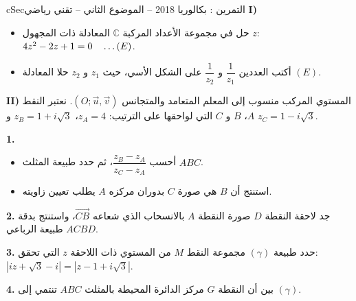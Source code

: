 \documentclass[12pt,a4paper]{article}
\newenvironment{BOX}[2]{\begin{otherlanguage}{english}\begin{arbox}{#1}{#2}}{\end{arbox}\end{otherlanguage}}
\newcounter{exo}
\newenvironment{tamrin}[1]{\stepcounter{exo}\begin{BOX}{cSec}{التمرين \theexo: #1}}{\end{BOX}}
\renewcommand{\dots}{\mathinner{\ldotp\ldotp\ldotp}}
\newenvironment{sq}{\begin{itemize}[leftmargin=2.4em,itemsep=3pt]}{\end{itemize}}
\newcommand{\qa}{\item[(أ)]}\newcommand{\qb}{\item[(ب)]}\newcommand{\qc}{\item[(جـ)]}\newcommand{\qd}{\item[(د)]}\newcommand{\qe}{\item[(هـ)]}
\newcommand{\QQ}[1]{\par\smallskip\textbf{#1.} }
\begin{document}
\begin{tamrin}{بكالوريا 2018 -- الموضوع الثاني -- تقني رياضي}
\textbf{I)}
\begin{sq}
\qa حل في مجموعة الأعداد المركبة $\mathbb{C}$ المعادلة ذات المجهول $z$: $4z^2-2z+1=0\quad\dots(E)$.
\qb أكتب العددين $\dfrac{1}{z_1}$ و $\dfrac{1}{z_2}$ على الشكل الأسي، حيث $z_1$ و $z_2$ حلا المعادلة $(E)$.
\end{sq}
\textbf{II)} المستوي المركب منسوب إلى المعلم المتعامد والمتجانس $(O;\vec u,\vec v)$. نعتبر النقط $A$، $B$ و $C$ التي لواحقها على الترتيب: $z_A=4$، $z_B=1+i\sqrt3$ و $z_C=1-i\sqrt3$.

\QQ{1}
\begin{sq}
\qa أحسب $\dfrac{z_B-z_A}{z_C-z_A}$، ثم حدد طبيعة المثلث $ABC$.
\qb استنتج أن $B$ هي صورة $C$ بدوران مركزه $A$ يطلب تعيين زاويته.
\end{sq}
\QQ{2} جد لاحقة النقطة $D$ صورة النقطة $A$ بالانسحاب الذي شعاعه $\overrightarrow{CB}$، واستنتج بدقة طبيعة الرباعي $ACBD$.

\QQ{3} حدد طبيعة $(\gamma)$ مجموعة النقط $M$ من المستوي ذات اللاحقة $z$ التي تحقق: $\left|iz+\sqrt3-i\right|=\left|z-1+i\sqrt3\right|$.

\QQ{4} بين أن النقطة $G$ مركز الدائرة المحيطة بالمثلث $ABC$ تنتمي إلى $(\gamma)$.
\end{tamrin}
\end{document}
